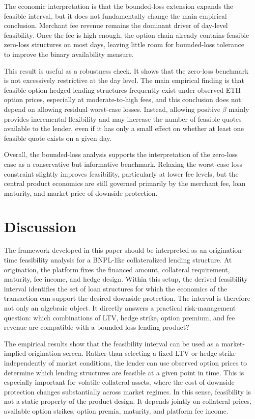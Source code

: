 \documentclass[11pt]{article}
\begin{document}
The economic interpretation is that the bounded-loss extension expands the feasible interval, but it does not fundamentally change the main empirical conclusion. Merchant fee revenue remains the dominant driver of day-level feasibility. Once the fee is high enough, the option chain already contains feasible zero-loss structures on most days, leaving little room for bounded-loss tolerance to improve the binary availability measure.

This result is useful as a robustness check. It shows that the zero-loss benchmark is not excessively restrictive at the day level. The main empirical finding is that feasible option-hedged lending structures frequently exist under observed ETH option prices, especially at moderate-to-high fees, and this conclusion does not depend on allowing residual worst-case losses. Instead, allowing positive $\beta$ mainly provides incremental flexibility and may increase the number of feasible quotes available to the lender, even if it has only a small effect on whether at least one feasible quote exists on a given day.

Overall, the bounded-loss analysis supports the interpretation of the zero-loss case as a conservative but informative benchmark. Relaxing the worst-case loss constraint slightly improves feasibility, particularly at lower fee levels, but the central product economics are still governed primarily by the merchant fee, loan maturity, and market price of downside protection.


\section{Discussion}

The framework developed in this paper should be interpreted as an origination-time feasibility analysis for a BNPL-like collateralized lending structure. At origination, the platform fixes the financed amount, collateral requirement, maturity, fee income, and hedge design. Within this setup, the derived feasibility interval identifies the set of loan structures for which the economics of the transaction can support the desired downside protection. The interval is therefore not only an algebraic object. It directly answers a practical risk-management question: which combinations of LTV, hedge strike, option premium, and fee revenue are compatible with a bounded-loss lending product?

The empirical results show that the feasibility interval can be used as a market-implied origination screen. Rather than selecting a fixed LTV or hedge strike independently of market conditions, the lender can use observed option prices to determine which lending structures are feasible at a given point in time. This is especially important for volatile collateral assets, where the cost of downside protection changes substantially across market regimes. In this sense, feasibility is not a static property of the product design. It depends jointly on collateral prices, available option strikes, option premia, maturity, and platform fee income.
\end{document}
